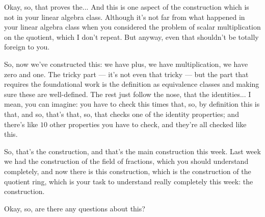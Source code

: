 \begin{speech}[00:47:25 - 00:48:47]
Okay, so, that proves the...  And this is one aspect of the construction which is not in your linear algebra class. Although it's not far from what happened in your linear algebra class when you considered the problem of scalar multiplication on the quotient, which I don't repeat. But anyway, even that shouldn't be totally foreign to you. 

So, now we've constructed this: we have plus, we have multiplication, we have zero and one.  The tricky part --- it's not even that tricky --- but the part that requires the foundational work is the definition as equivalence classes and making sure these are well-defined. The rest just follow the nose, that the identities... I mean, you can imagine: you have to check this times that, so, by definition this is that, and so, that's that, so, that checks one of the identity properties; and there's like $10$ other properties you have to check, and they're all checked like this.  

So, that's the construction, and that's the main construction this week. Last week we had the construction of the field of fractions, which you should understand completely, and now there is this construction, which is the construction of the quotient ring, which is your task to understand really completely this week: the construction. 

Okay, so, are there any questions about this?
\end{speech}

